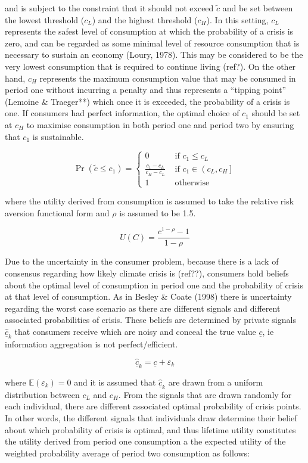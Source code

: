 \documentclass[11pt,preprint, authoryear]{elsarticle}
\numberwithin{equation}{section}
\numberwithin{figure}{section}
\numberwithin{table}{section}
\begin{document}
and is subject to the constraint that it should not exceed \(\tilde{c}\)
and be set between the lowest threshold (\(c_L\)) and the highest
threshold (\(c_H\)). In this setting, \(c_L\) represents the safest
level of consumption at which the probability of a crisis is zero, and
can be regarded as some minimal level of resource consumption that is
necessary to sustain an economy (Loury, 1978). This may be considered to
be the very lowest consumption that is required to continue living
(ref?). On the other hand, \(c_H\) represents the maximum consumption
value that may be consumed in period one without incurring a penalty and
thus represents a ``tipping point'' (Lemoine \& Traeger**) which once it
is exceeded, the probability of a crisis is one. If consumers had
perfect information, the optimal choice of \(c_1\) should be set at
\(c_H\) to maximise consumption in both period one and period two by
ensuring that \(c_1\) is sustainable.

\[
\operatorname{Pr}\left(\tilde{c} \leq c_1\right)=\left\{\begin{array}{cc}
0 & \text { if } c_1 \leq c_L \\
\frac{c_1-c_L}{c_H-c_L} & \text { if } c_1 \in\left(c_L, c_H\right] \\
1 & \text { otherwise }
\end{array}\right.
\]

where the utility derived from consumption is assumed to take the
relative risk aversion functional form and \(\rho\) is assumed to be
1.5.

\[
U(C)=\frac{c^{1-\rho}-1}{1-\rho}
\]

Due to the uncertainty in the consumer problem, because there is a lack
of consensus regarding how likely climate crisis is (ref??), consumers
hold beliefs about the optimal level of consumption in period one and
the probability of crisis at that level of consumption. As in Besley \&
Coate (1998) there is uncertainty regarding the worst case scenario as
there are different signals and different associated probabilities of
crisis. These beliefs are determined by private signals
\(\hat{\underline{c}}_k\) that consumers receive which are noisy and
conceal the true value \(\underline{c}\), ie information aggregation is
not perfect/efficient.

\[
\hat{\underline{c}}_k=\underline{c}+\varepsilon_k
\]

where \(\mathbb{E}\left(\varepsilon_k\right)=0\) and it is assumed that
\(\hat{\underline{c}}_k\) are drawn from a uniform distribution between
\(c_L\) and \(c_H\). From the signals that are drawn randomly for each
individual, there are different associated optimal probability of crisis
points. In other words, the different signals that individuals draw
determine their belief about which probability of crisis is optimal, and
thus lifetime utility constitutes the utility derived from period one
consumption a the expected utility of the weighted probability average
of period two consumption as follows:
\end{document}
